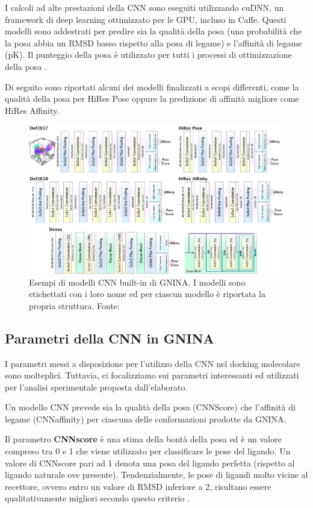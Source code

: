 I calcoli ad alte prestazioni della CNN sono eseguiti utilizzando cuDNN, un framework di deep learning  ottimizzato per le GPU, incluso in Caffe. Questi modelli sono addestrati per predire sia la qualità della posa (una probabilità che la posa abbia un RMSD basso rispetto alla posa di legame) e l'affinità di legame (pK). 
Il punteggio della posa è utilizzato per tutti i processi di ottimizzazione della posa \cite{mcnutt_gnina_2021}.

Di seguito sono riportati alcuni dei modelli finalizzati a scopi differenti, come la qualità della posa per HiRes Pose oppure la predizione di affinità migliore come HiRes Affinity.
\begin{figure}[H]
    \centering
    \includegraphics[scale=0.12]{images/chapter2/models.jpg}
    \caption[Esempi di modelli CNN built-in di GNINA.]{Esempi di modelli CNN built-in di GNINA. I modelli sono etichettati con i loro nome ed per ciascun modello è riportata la propria struttura. Fonte: \cite{mcnutt_gnina_2021}}
    \label{fig:models}
\end{figure}

\subsection{Parametri della CNN in GNINA} \label{cnn_params}
I parametri messi a disposizione per l'utilizzo della CNN nel docking molecolare sono molteplici. Tuttavia, ci focalizziamo sui parametri interessanti ed utilizzati per l'analisi sperimentale proposta dall'elaborato.

Un modello CNN prevede sia la qualità della posa (CNNScore) che l'affinità di legame (CNNaffinity) per ciascuna delle conformazioni prodotte da GNINA. 

Il parametro \textbf{CNNscore} è una stima della bontà della posa ed è un valore compreso tra 0 e 1 che viene utilizzato per classificare le pose del ligando. Un valore di CNNscore pari ad 1 denota una posa del ligando perfetta (rispetto al ligando naturale ove presente). Tendenzialmente, le pose di ligandi molto vicine al recettore, ovvero entro un valore di RMSD inferiore a 2, risultano essere qualitativamente migliori secondo questo criterio \cite{mcnutt_gnina_2021}.

